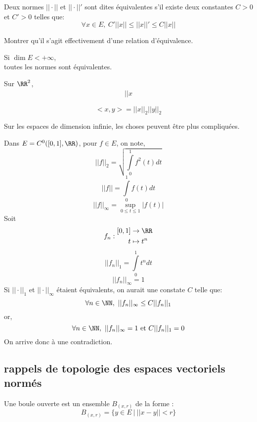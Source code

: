\documentclass[../main.tex]{subfile}
\begin{document}
\begin{defi}
	Deux normes $||\cdot||$ et $||\cdot||'$ sont dites équivalentes s'il existe deux constantes $C > 0$ et $C' > 0$ telles que:
	$$\forall x \in E, \ C'||x|| \leq ||x||' \leq C||x||$$
\end{defi}

\begin{exerc}
	Montrer qu'il s'agit effectivement d'une relation d'équivalence.
\end{exerc}

\begin{theo}
	Si  $\dim E < + \infty$, \\
	toutes les normes sont équivalentes.
\end{theo}

\begin{ex}
	Sur $\RR^2$, \\
	$$
\begin{aligned}
	||x
\end{aligned}
	$$
\end{ex}

\begin{rap}
	$$<x, y> = ||x||_2||y||_2$$
\end{rap}


Sur les espaces de dimension infinie, les choses peuvent être plus compliquées.
\begin{ex}
	Dans $E = C^0([0, 1], \RR)$, pour $f \in E$, on note, \\
	$$||f||_2 = \sqrt{\int\limits_0^1 f^2(t)dt}$$
	$$||f|| = \int\limits_0^1 f(t)dt$$
	$$||f||_\infty = \sup\limits_{0 \leq t \leq 1} |f(t)|$$
	Soit 
	$$f_n:
\begin{aligned}
	[0, 1] &\to \RR\\
	t &\mapsto t^n
\end{aligned}
	$$
	$$||f_n||_1 = \int\limits_0^1 t^ndt$$
	$$||f_n||_\infty = 1$$
	Si $||\cdot||_1$ et $||\cdot||_\infty$ étaient équivalents, on aurait une constate $C$ telle que:\\
	$$\forall n \in \NN, \ ||f_n||_\infty \leq C ||f_n||_1$$
	or, 
	$$\forall n \in \NN, \ ||f_n||_\infty = 1 \text{ et } C ||f_n||_1 = 0$$
	On arrive donc à une contradiction.
\end{ex}

\subsection{rappels de topologie des espaces vectoriels normés}
\begin{defi}
	Une boule ouverte est un ensemble $B_{(x, r)}$ de la forme : 
	$$B_{(x, r)} = \{y \in E \ | \ ||x - y|| < r\}$$
\end{defi}
\end{document}
